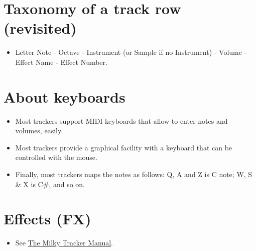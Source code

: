 \section{Taxonomy of a track row (revisited)}
\begin{itemize}
\item Letter Note - Octave - Instrument (or Sample if no Instrument) -
  Volume - Effect Name - Effect Number.
\end{itemize}

\section{About keyboards}
\begin{itemize}
\item Most trackers support MIDI keyboards that allow to enter notes
  and volumes, easily.
\item Most trackers provide a graphical facility with a keyboard that
  can be controlled with the mouse.
\item Finally, most trackers maps the notes as follows: Q, A and Z is
  C note; W, S \& X is C\#, and so on.
\end{itemize}

\section{Effects (FX)}
\begin{itemize}
\item See
  \href{http://www.milkytracker.org/docs/MilkyTracker.html\#commands}{The
    Milky Tracker Manual}.
\end{itemize}

